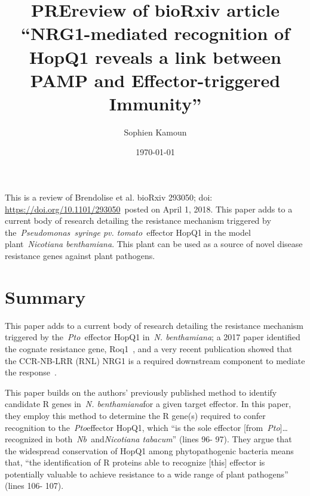 \documentclass[10pt]{article}
\let\cite\citep
\renewenvironment{abstract}
  {{\bfseries\noindent{\abstractname}\par\nobreak}\footnotesize}
  {\bigskip}
\providecommand\citep{\cite}
\begin{document}
\title{PREreview of bioRxiv article ``NRG1-mediated recognition of HopQ1
reveals a link between PAMP and Effector-triggered Immunity''}



\author[1]{Sophien Kamoun}%
%


\vspace{-1em}



  \date{\today}


\begingroup
\let\center\flushleft
\let\endcenter\endflushleft
\maketitle
\endgroup





\begin{abstract}
This is a review of Brendolise et al. bioRxiv 293050; doi:
\url{https://doi.org/10.1101/293050}~posted on April 1, 2018. This paper
adds to a current body of research detailing the resistance mechanism
triggered by the~\emph{Pseudomonas~syringe pv. tomato~}effector HopQ1 in
the model plant~\emph{Nicotiana benthamiana}. This plant can be used as
a source of novel disease resistance genes against plant pathogens.%
\end{abstract}%




\par\null

\section*{Summary}

{\label{216049}}\par\null

This paper adds to a current body of research detailing the resistance
mechanism triggered by the~\emph{Pto~}effector HopQ1 in~\emph{N.
benthamiana}; a 2017 paper identified the cognate resistance gene,
Roq1~\cite{Schultink2017}, and a very recent publication showed that the
CCR-NB-LRR (RNL) NRG1 is a required downstream component to mediate the
response~\cite{Qi_2018}.

This paper builds on the authors' previously published method to
identify candidate R genes in~\emph{N. benthamiana}for a given target
effector. In this paper, they employ this method to determine the R
gene(s) required to confer recognition to the~\emph{Pto}effector HopQ1,
which ``is the sole effector {[}from~\emph{Pto}{]}\ldots{} recognized in
both~\emph{Nb~}and\emph{Nicotiana tabacum}'' (lines 96- 97). They argue
that the widespread conservation of HopQ1 among phytopathogenic bacteria
means that, ``the identification of R proteins able to recognize
{[}this{]} effector is potentially valuable to achieve resistance to a
wide range of plant pathogens'' (lines 106- 107).~
\end{document}
